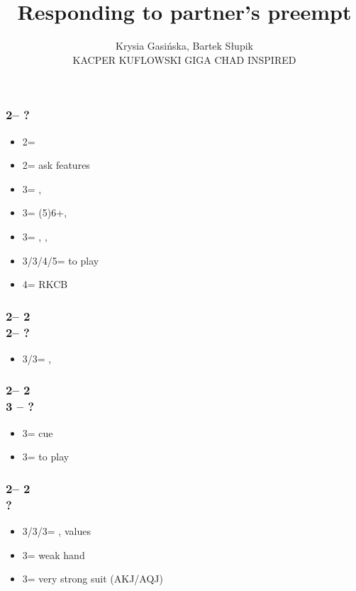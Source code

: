 \documentclass[12pt, a4paper]{article}
\title{Responding to partner's preempt}
\author{Krysia Gasińska, Bartek Słupik\\
        \textsc{KACPER KUFLOWSKI GIGA CHAD INSPIRED}}
\begin{document}
\maketitle


\subsubsection*{2\hearts -- ?}
\begin{itemize}
    \item 2\spades = \lsf
    \item 2\nt = ask \nt features
    \item 3\clubs = \minor, \gf
    \item 3\diams = (5)6+\spades, \invp \vimp
    \item 3\spades = \spades, \inv, \nf
    \item 3\hearts/3\nt/4\major/5\minor = to play
    \item 4\clubs = RKCB
\end{itemize}

\subsubsection*{2\hearts -- 2\spades\\
                2\nt -- ?}
\begin{itemize}
    \item 3\clubs/3\diams = \nat, \inv
\end{itemize}

\subsubsection*{2\hearts -- 2\spades\\
                3 -- ?}
\begin{itemize}
    \item 3\spades = cue
    \item 3\nt = to play
\end{itemize}

\subsubsection*{2\hearts -- 2\nt\\
                ?}
\begin{itemize}
    \item 3\clubs/3\diams/3\spades = \nat, \nt values
    \item 3\hearts = weak hand
    \item 3\nt = very strong suit (AKJ/AQJ)
\end{itemize}
\end{document}
